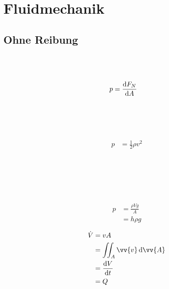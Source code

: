 \section{Fluidmechanik}

\subsection{Ohne Reibung}

\begin{boxleft}
\\
\\
\end{boxleft}\begin{boxrightshaded}
\begin{align}
p&=\frac{\mathop{}\!\mathrm{d} F_N}{\mathop{}\!\mathrm{d} A}
\end{align}
\end{boxrightshaded}

\begin{boxleft}
\\
\\
\\
\end{boxleft}\begin{boxrightshaded}
\begin{align}
p&=\frac{1}{2}\rho v^2
\end{align}
\end{boxrightshaded}

\begin{boxleft}
\\
\\
\\
\\
\end{boxleft}\begin{boxrightshaded}
\begin{align}
p&=\frac{\rho V g}{A}\\
&=h\rho g
\end{align}
\end{boxrightshaded}

\begin{boxleft}
\end{boxleft}\begin{boxrightshaded}
\begin{align}
\dot{V}&=v A\\
&=\iint_A \vv{v} \diff\vv{ A}\\
&=\frac{\diff V}{\diff t}\\
&=Q
\end{align}
\end{boxrightshaded}

